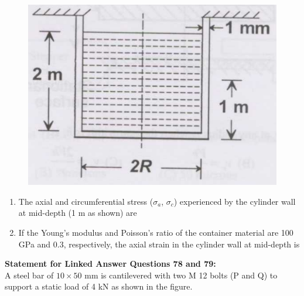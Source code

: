 \documentclass[journal,12pt,onecolumn]{IEEEtran}
\begin{document}
\begin{figure}[H]
    \centering
    \includegraphics[scale=0.3]{q76}
    \caption{}
    \label{q76}
\end{figure}
\begin{enumerate}[resume]
    \item The axial and circumferential stress ($\sigma_a$, $\sigma_c$) experienced by the cylinder wall at mid-depth (1 m as shown) are
          \begin{enumerate}
          \end{enumerate}

    \item If the Young's modulus and Poisson's ratio of the container material are 100 GPa and 0.3, respectively, the axial strain in the cylinder wall at mid-depth is
          \begin{enumerate}
          \end{enumerate}

\end{enumerate}
\normalsize\textbf{Statement for Linked Answer Questions 78 and 79:}\\
A steel bar of $10\times50$ mm is cantilevered with two M 12 bolts (P and Q) to support a static load of 4 kN as shown in the figure.
\end{document}
